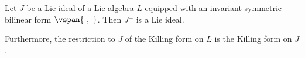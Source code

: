 Let $J$ be a Lie ideal of a Lie algebra $L$ equipped with an invariant
symmetric bilinear form $\vspan{\ ,\ }$. Then $J^\perp$ is a Lie ideal.

Furthermore, the restriction to $J$ of the Killing form on $L$ is the
Killing form on $J$.
